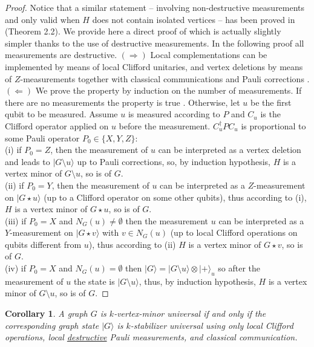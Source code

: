 \documentclass[10pt,a4paper]{article}
\newtheorem{corollary}{Corollary}[section]
\newcommand{\ket}[1]{{\ensuremath{\lvert#1\rangle}}}
\begin{document}
\begin{proof} Notice that a similar statement -- involving non-destructive measurements and only valid when $H$ does not contain isolated vertices -- has been proved in \cite{DWH:transfo} (Theorem 2.2). We provide here a direct proof of  which is actually slightly simpler thanks to the use of destructive measurements. In the following proof all measurements are destructive. $(\Rightarrow)$ Local complementations can be implemented by means of local Clifford unitaries, and vertex deletions by means of $Z$-measurements together with classical communications and Pauli corrections \cite{VandenNest04}. $(\Leftarrow)$ We prove the property by induction on the number of measurements. If there are no measurements the property is true \cite{VandenNest04}. Otherwise, let $u$ be the first qubit to be measured. Assume $u$ is measured according to $P$ and $C_u$ is the Clifford operator applied on $u$ before the measurement. $C_u^\dagger P C_u$ is proportional to some Pauli operator $P_0\in \{X,Y,Z\}$: 
\\(i) if $P_0=Z$, then the measurement of $u$ can be interpreted as a vertex deletion and leads to $\ket{G\setminus u}$ up to Pauli corrections, so, by induction hypothesis, $H$ is a vertex minor of $G\setminus u$, so is of $G$. 
\\(ii) if $P_0=Y$, then the measurement of $u$ can be interpreted as a $Z$-measurement on $\ket{G\star u}$ (up to a Clifford operator on some other qubits), thus according to (i), $H$ is a vertex minor of $G\star u$, so is of $G$. 
\\(iii) if $P_0=X$ and $N_G(u)\neq \emptyset$ then  the measurement $u$ can be interpreted as a $Y$-measurement on $\ket{G\star v}$ with $v\in N_G(u)$ (up to local Clifford operations on qubits different from $u$), thus according to (ii) $H$ is a vertex minor of $G\star v$, so is of $G$. 
\\(iv) if $P_0=X$ and $N_G(u)=\emptyset$ then $\ket G = \ket {G\setminus u}\otimes \ket +_u$ so after the measurement of $u$ the state is $\ket {G\setminus u}$, thus, by induction hypothesis, $H$ is a vertex minor of $G\setminus u$, so is of $G$.  
\end{proof}

\begin{corollary}
    A graph $G$ is $k$-vertex-minor universal if and only if the corresponding graph state $\ket G$ is $k$-stabilizer universal using only local Clifford operations, local \underline{destructive} Pauli measurements, and classical communication.     
\end{corollary}
\end{document}
